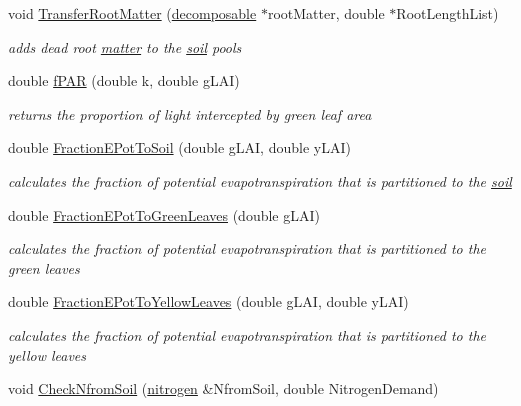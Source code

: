\begin{DoxyCompactItemize}
\item 
void \hyperlink{classecosystem_a8355ba8e9658dde9faed9a4e90ac6548}{TransferRootMatter} (\hyperlink{classdecomposable}{decomposable} $\ast$rootMatter, double $\ast$RootLengthList)
\begin{DoxyCompactList}\small\item\em adds dead root \hyperlink{classmatter}{matter} to the \hyperlink{classsoil}{soil} pools \item\end{DoxyCompactList}\item 
double \hyperlink{classecosystem_a2176cebabe57a848605f4ecce56615e0}{fPAR} (double k, double gLAI)
\begin{DoxyCompactList}\small\item\em returns the proportion of light intercepted by green leaf area \item\end{DoxyCompactList}\item 
double \hyperlink{classecosystem_a225153ac450b442797c2485c0cd991a4}{FractionEPotToSoil} (double gLAI, double yLAI)
\begin{DoxyCompactList}\small\item\em calculates the fraction of potential evapotranspiration that is partitioned to the \hyperlink{classsoil}{soil} \item\end{DoxyCompactList}\item 
double \hyperlink{classecosystem_afcfa64eac43a10c5a4bedcc74ce933ce}{FractionEPotToGreenLeaves} (double gLAI)
\begin{DoxyCompactList}\small\item\em calculates the fraction of potential evapotranspiration that is partitioned to the green leaves \item\end{DoxyCompactList}\item 
double \hyperlink{classecosystem_a247d1f0772f29aed1a37a277f15eecf6}{FractionEPotToYellowLeaves} (double gLAI, double yLAI)
\begin{DoxyCompactList}\small\item\em calculates the fraction of potential evapotranspiration that is partitioned to the yellow leaves \item\end{DoxyCompactList}\item 
void \hyperlink{classecosystem_aaa5cad8de95fb94e74a33295332efe18}{CheckNfromSoil} (\hyperlink{classnitrogen}{nitrogen} \&NfromSoil, double NitrogenDemand)

\end{DoxyCompactItemize}
